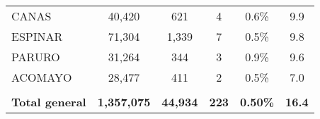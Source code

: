 \begin{tabular}{lccccc}
	\cellcolor[HTML]{FFFF99}CANAS                                   & 40,420               & 621                                  & 4                    & 0.6\%                      & 9.9                                         \\
	\cellcolor[HTML]{FFFF99}ESPINAR                                 & 71,304               & 1,339                                & 7                    & 0.5\%                      & 9.8                                         \\
	\cellcolor[HTML]{FFFF99}PARURO                                  & 31,264               & 344                                  & 3                    & 0.9\%                      & 9.6                                         \\
	\cellcolor[HTML]{FFFF99}ACOMAYO                                 & 28,477               & 411                                  & 2                    & 0.5\%                      & 7.0                                         \\
	& \multicolumn{1}{l}{} & \multicolumn{1}{l}{}                 & \multicolumn{1}{l}{} & \multicolumn{1}{l}{}       & \multicolumn{1}{l}{}                        \\
	\rowcolor[HTML]{DDEBF7} 
	\textbf{Total general}                                          & \textbf{1,357,075}   & \textbf{44,934}                      & \textbf{223}         & \textbf{0.50\%}            & \textbf{16.4}                              
\end{tabular}